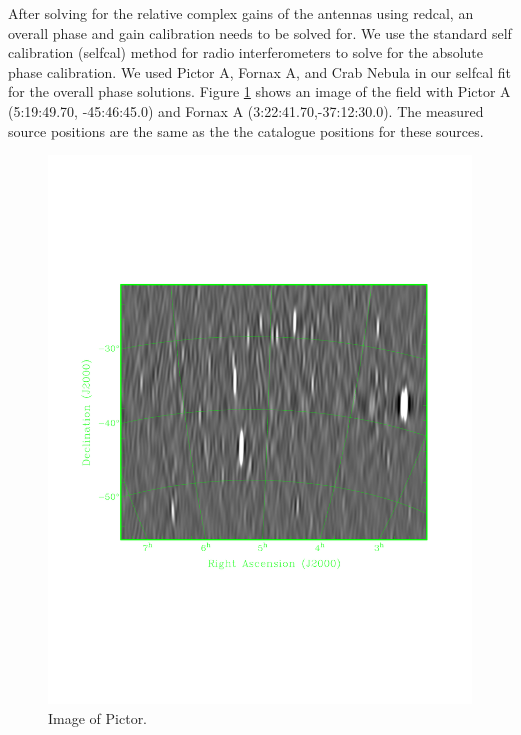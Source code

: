 \documentclass[twocolumn,numberedappendix]{emulateapj} \shorttitle{PSA64}
\begin{document}
After solving for the relative complex gains of the antennas using redcal, an
overall phase and gain calibration needs to be solved for. We use the standard self
calibration (selfcal) method for radio interferometers to solve for the absolute
phase calibration. We used Pictor A, Fornax A, and Crab Nebula in our selfcal
fit for the overall phase solutions. Figure \ref{fig:field_image} shows an image
of the field with Pictor A (5:19:49.70, -45:46:45.0)  and Fornax A
(3:22:41.70,-37:12:30.0). The measured source positions are the same as the the
catalogue positions for these sources.

\begin{figure}
\centering
\includegraphics[width=\columnwidth]{plots/gianni_pic_image.pdf}
\caption{Image of Pictor.}
\label{fig:field_image}
\end{figure}
\end{document}
